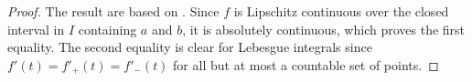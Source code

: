 \documentclass[12pt]{amsart}
\newcommand{\0}{\mat{0}}
\newcommand{\1}{\mathds{1}}
\begin{document}
\begin{proof}
  The result are based on \citep{MohriRostamizadehTalwalkar2012}.
  Since $f$ is Lipschitz continuous over the closed interval in $I$
  containing $a$ and $b$, it is absolutely continuous, which proves
  the first equality. The second equality is clear for Lebesgue
  integrals since $f'(t) = f'_+(t) = f'_-(t)$ for all but at most a
  countable set of points.
\end{proof}


 

\end{document}
